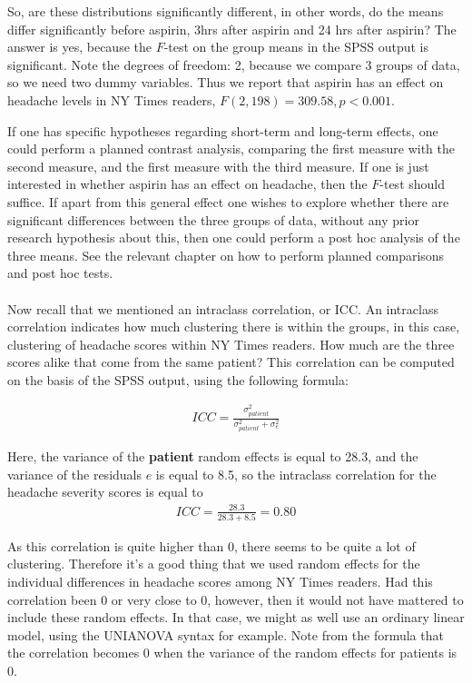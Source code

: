 \documentclass[]{report}\usepackage[]{graphicx}\usepackage[]{color}
\begin{document}
So, are these distributions significantly different, in other words, do the means differ significantly before aspirin, 3hrs after aspirin and 24 hrs after aspirin? The answer is yes, because the $F$-test on the group means in the SPSS output is significant. Note the degrees of freedom: 2, because we compare 3 groups of data, so we need two dummy variables. Thus we report that aspirin has an effect on headache levels in NY Times readers, $F(2, 198)=309.58, p<0.001$.

If one has specific hypotheses regarding short-term and long-term effects, one could perform a planned contrast analysis, comparing the first measure with the second measure, and the first measure with the third measure. If one is just interested in whether aspirin has an effect on headache, then the $F$-test should suffice. If apart from this general effect one wishes to explore whether there are significant differences between the three groups of data, without any prior research hypothesis about this, then one could perform a post hoc analysis of the three means. See the relevant chapter on how to perform planned comparisons and post hoc tests.
\\
\\
Now recall that we mentioned an intraclass correlation, or ICC. An intraclass correlation indicates how much clustering there is within the groups, in this case, clustering of headache scores within NY Times readers. How much are the three scores alike that come from the same patient? This correlation can be computed on the basis of the SPSS output, using the following formula:

\begin{eqnarray}
ICC = \frac{\sigma^2_{patient} } {\sigma^2_{patient} +\sigma^2_e }   
\end{eqnarray}

Here, the variance of the \textbf{patient} random effects is equal to 28.3, and the variance of the residuals $e$ is equal to 8.5, so the intraclass correlation for the headache severity scores is equal to 
\begin{eqnarray}
ICC = \frac{28.3} {28.3 + 8.5 } =  0.80
\end{eqnarray}

As this correlation is quite higher than 0, there seems to be quite a lot of clustering. Therefore it's a good thing that we used random effects for the individual differences in headache scores among NY Times readers. Had this correlation been 0 or very close to 0, however, then it would not have mattered to include these random effects. In that case, we might as well use an ordinary linear model, using the UNIANOVA syntax for example. Note from the formula that the correlation becomes 0 when the variance of the random effects for patients is 0.
\\
\\
\end{document}

